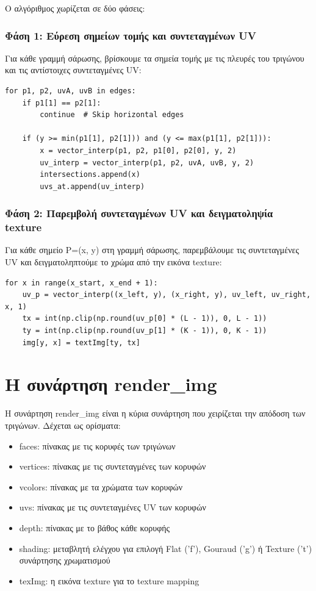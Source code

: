 \documentclass{article}
\begin{document}
Ο αλγόριθμος χωρίζεται σε δύο φάσεις:

\subsubsection{Φάση 1: Εύρεση σημείων τομής και συντεταγμένων UV}
Για κάθε γραμμή σάρωσης, βρίσκουμε τα σημεία τομής με τις πλευρές του τριγώνου και τις αντίστοιχες συντεταγμένες UV:

\begin{lstlisting}
for p1, p2, uvA, uvB in edges:
    if p1[1] == p2[1]:
        continue  # Skip horizontal edges

    if (y >= min(p1[1], p2[1])) and (y <= max(p1[1], p2[1])):
        x = vector_interp(p1, p2, p1[0], p2[0], y, 2)
        uv_interp = vector_interp(p1, p2, uvA, uvB, y, 2)
        intersections.append(x)
        uvs_at.append(uv_interp)
\end{lstlisting}

\subsubsection{Φάση 2: Παρεμβολή συντεταγμένων UV και δειγματοληψία texture}
Για κάθε σημείο P=(x, y) στη γραμμή σάρωσης, παρεμβάλουμε τις συντεταγμένες UV και δειγματοληπτούμε το χρώμα από την εικόνα texture:

\begin{lstlisting}
for x in range(x_start, x_end + 1):
    uv_p = vector_interp((x_left, y), (x_right, y), uv_left, uv_right, x, 1)
    tx = int(np.clip(np.round(uv_p[0] * (L - 1)), 0, L - 1))
    ty = int(np.clip(np.round(uv_p[1] * (K - 1)), 0, K - 1))
    img[y, x] = textImg[ty, tx]
\end{lstlisting}

\section{Η συνάρτηση render\_img}
Η συνάρτηση render\_img είναι η κύρια συνάρτηση που χειρίζεται την απόδοση των τριγώνων. Δέχεται ως ορίσματα:
\begin{itemize}
  \item faces: πίνακας με τις κορυφές των τριγώνων
  \item vertices: πίνακας με τις συντεταγμένες των κορυφών
  \item vcolors: πίνακας με τα χρώματα των κορυφών
  \item uvs: πίνακας με τις συντεταγμένες UV των κορυφών
  \item depth: πίνακας με το βάθος κάθε κορυφής
  \item shading: μεταβλητή ελέγχου για επιλογή Flat ('f'), Gouraud ('g') ή Texture ('t') συνάρτησης χρωματισμού
  \item texImg: η εικόνα texture για το texture mapping
\end{itemize}
\end{document}
